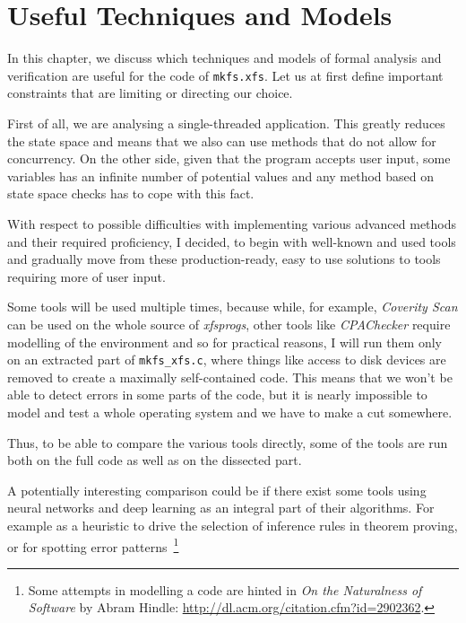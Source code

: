
\chapter{Useful Techniques and Models}\label{chap:techniques}

In this chapter, we discuss which techniques and models of formal analysis and verification are useful for the code of {\tt mkfs.xfs}. Let us at first define important constraints that are limiting or directing our choice.

First of all, we are analysing a single-threaded application. This greatly reduces the state space and means that we also can use methods that do not allow for concurrency. On the other side, given that the program accepts user input, some variables has an infinite number of potential values and any method based on state space checks has to cope with this fact.

With respect to possible difficulties with implementing various advanced methods and their required proficiency, I decided, to begin with well-known and used tools and gradually move from these production-ready, easy to use solutions to tools requiring more of user input.

Some tools will be used multiple times, because while, for example, {\em Coverity Scan} can be used on the whole source of {\em xfsprogs}, other tools like {\em CPAChecker} require modelling of the environment and so for practical reasons, I will run them only on an extracted part of {\tt mkfs\_xfs.c}, where things like access to disk devices are removed to create a maximally self-contained code. This means that we won't be able to detect errors in some parts of the code, but it is nearly impossible to model and test a whole operating system and we have to make a cut somewhere. 

Thus, to be able to compare the various tools directly, some of the tools are run both on the full code as well as on the dissected part.

A potentially interesting comparison could be if there exist some tools using neural networks and deep learning as an integral part of their algorithms. For example as a heuristic to drive the selection of inference rules in theorem proving, or for spotting error patterns~\footnote{Some attempts in modelling a code are hinted in {\em On the Naturalness of Software} by Abram Hindle: \url{http://dl.acm.org/citation.cfm?id=2902362}.}

